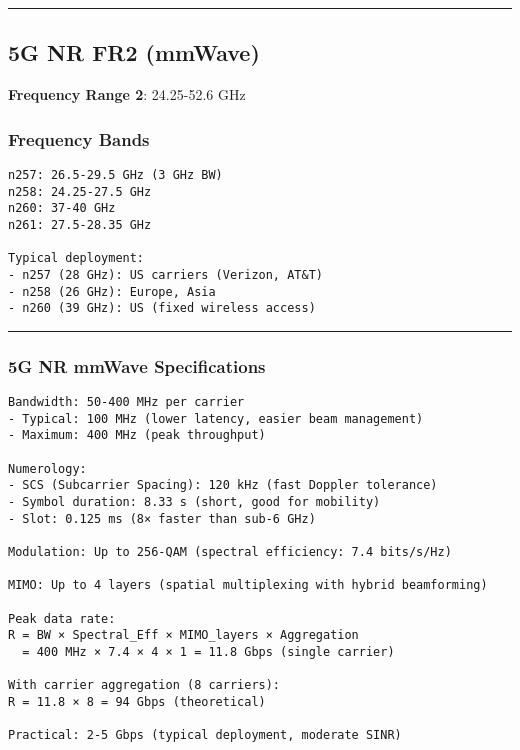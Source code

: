 \begin{center}\rule{0.5\linewidth}{0.5pt}\end{center}

\subsection{\texorpdfstring{ 5G NR FR2
(mmWave)}{ 5G NR FR2 (mmWave)}}\label{g-nr-fr2-mmwave}

\textbf{Frequency Range 2}: 24.25-52.6 GHz

\subsubsection{Frequency Bands}\label{frequency-bands}

\begin{verbatim}
n257: 26.5-29.5 GHz (3 GHz BW)
n258: 24.25-27.5 GHz
n260: 37-40 GHz
n261: 27.5-28.35 GHz

Typical deployment:
- n257 (28 GHz): US carriers (Verizon, AT&T)
- n258 (26 GHz): Europe, Asia
- n260 (39 GHz): US (fixed wireless access)
\end{verbatim}

\begin{center}\rule{0.5\linewidth}{0.5pt}\end{center}

\subsubsection{5G NR mmWave
Specifications}\label{g-nr-mmwave-specifications}

\begin{verbatim}
Bandwidth: 50-400 MHz per carrier
- Typical: 100 MHz (lower latency, easier beam management)
- Maximum: 400 MHz (peak throughput)

Numerology:
- SCS (Subcarrier Spacing): 120 kHz (fast Doppler tolerance)
- Symbol duration: 8.33 s (short, good for mobility)
- Slot: 0.125 ms (8× faster than sub-6 GHz)

Modulation: Up to 256-QAM (spectral efficiency: 7.4 bits/s/Hz)

MIMO: Up to 4 layers (spatial multiplexing with hybrid beamforming)

Peak data rate:
R = BW × Spectral_Eff × MIMO_layers × Aggregation
  = 400 MHz × 7.4 × 4 × 1 = 11.8 Gbps (single carrier)
  
With carrier aggregation (8 carriers):
R = 11.8 × 8 = 94 Gbps (theoretical)

Practical: 2-5 Gbps (typical deployment, moderate SINR)
\end{verbatim}

